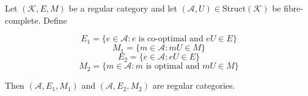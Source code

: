 Let $(\mathcal{K}, E, M)$ be a regular category and let $(\mathcal{A}, U) \in \mathrm{Struct}(\mathcal{K})$ be fibre-complete. Define

$$E_1 = \{e \in \mathcal{A}: e \text{ is co-optimal and } eU \in E\}$$
$$M_1 = \{m \in \mathcal{A}: mU \in M\}$$
$$E_2 = \{e \in \mathcal{A}: eU \in E\}$$
$$M_2 = \{m \in \mathcal{A}: m \text{ is optimal and } mU \in M\}$$

Then $(\mathcal{A}, E_1, M_1)$ and $(\mathcal{A}, E_2, M_2)$ are regular categories.
